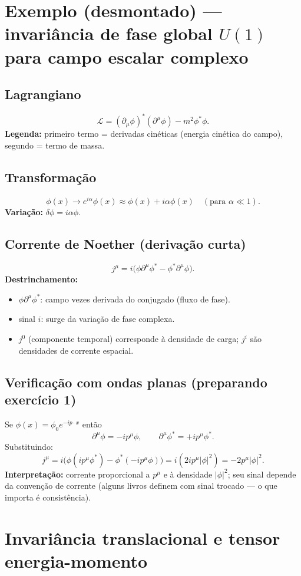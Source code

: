 \documentclass[12pt,a4paper]{article}
\begin{document}
\section{Exemplo (desmontado) --- invariância de fase global $U(1)$ para campo escalar complexo}
\subsection{Lagrangiano}
\[
\mathcal{L} = (\partial_\mu\phi)^*(\partial^\mu\phi) - m^2 \phi^*\phi.
\]
\textbf{Legenda:} primeiro termo = derivadas cinéticas (energia cinética do campo), segundo = termo de massa.

\subsection{Transformação}
\[
\phi(x)\to e^{i\alpha}\phi(x)\approx \phi(x)+i\alpha\phi(x)\quad(\text{para }\alpha\ll1).
\]
\textbf{Variação:} $\delta\phi = i\alpha\phi$.

\subsection{Corrente de Noether (derivação curta)}
\[
j^\mu = i\big(\phi\partial^\mu\phi^* - \phi^*\partial^\mu\phi\big).
\]
\textbf{Destrinchamento:}
\begin{itemize}
  \item $\phi\partial^\mu\phi^*$: campo vezes derivada do conjugado (fluxo de fase).
  \item sinal $i$: surge da variação de fase complexa.
  \item $j^0$ (componente temporal) corresponde à densidade de carga; $j^i$ são densidades de corrente espacial.
\end{itemize}

\subsection{Verificação com ondas planas (preparando exercício 1)}
Se $\phi(x)=\phi_0 e^{-ip\cdot x}$ então
\[
\partial^\mu\phi = -i p^\mu \phi,\qquad \partial^\mu\phi^*=+i p^\mu\phi^*.
\]
Substituindo:
\[
j^\mu = i\big(\phi (i p^\mu\phi^*) - \phi^*(-i p^\mu\phi)\big) = i(2 i p^\mu |\phi|^2) = -2 p^\mu |\phi|^2.
\]
\textbf{Interpretação:} corrente proporcional a \(p^\mu\) e à densidade \(|\phi|^2\); seu sinal depende da convenção de corrente (alguns livros definem com sinal trocado — o que importa é consistência).

\section{Invariância translacional e tensor energia-momento}
\end{document}
